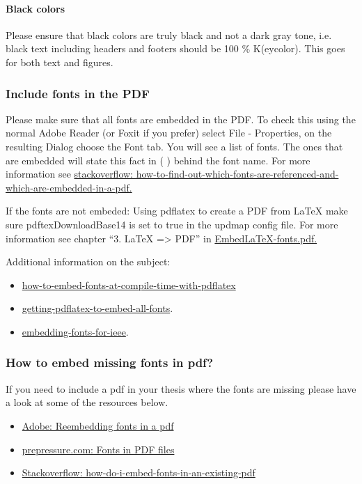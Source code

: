\paragraph{Black colors} Please ensure that black colors are truly black and not a dark gray tone, i.e. black text including headers and
footers should be 100 \% K(eycolor). This goes for both text and figures.

\subsubsection{Include fonts in the PDF} Please make sure that all fonts are embedded in the PDF. To check this using the normal Adobe Reader (or
Foxit if you prefer) select File - Properties, on the resulting Dialog choose the Font tab. You will see a list of fonts. The ones that are embedded will state this fact in ( ) behind the font name. For more information see \href{http://stackoverflow.com/questions/614619/how-to-find-out-which-fonts-are-referenced-and-which-are-embedded-in-a-pdf-docum}{stackoverflow: how-to-find-out-which-fonts-are-referenced-and-which-are-embedded-in-a-pdf.}

If the fonts are not embeded: Using pdflatex to create a PDF from LaTeX make sure pdftexDownloadBase14 is
set to true in the updmap config file. For more information see chapter “3. LaTeX => PDF” in \href{http://www.boekenenproefschriften.nl/proefschriften/sites/default/files/EmbedLaTeXfonts.pdf}{EmbedLaTeX-fonts.pdf.}

Additional information on the subject:
\begin{itemize}
    \item \href{http://tex.stackexchange.com/questions/10391/how-to-embed-fonts-at-compile-time-with-pdflatex}{how-to-embed-fonts-at-compile-time-with-pdflatex}
    \item \href{http://lemire.me/blog/2005/08/29/getting-pdflatex-to-embed-all-fonts/}{getting-pdflatex-to-embed-all-fonts}.
    \item \href{http://lemire.me/blog/2006/08/18/embedding-fonts-for-ieee/}{embedding-fonts-for-ieee}.
\end{itemize}

\subsubsection{How to embed missing fonts in pdf?}
If you need to include a pdf in your thesis where the fonts are missing please have a look at some of the resources
below.
\begin{itemize}
    \item \href{https://blogs.adobe.com/acrobatforlifesciences/2008/09/reembedding_fonts_in_a_pdf/}{Adobe: Reembedding fonts in a pdf}
    \item \href{http://www.prepressure.com/pdf/basics/fonts}{prepressure.com: Fonts in PDF files}
    \item \href{http://stackoverflow.com/questions/4231656/how-do-i-embed-fonts-in-an-existing-pdf}{Stackoverflow: how-do-i-embed-fonts-in-an-existing-pdf}
\end{itemize}

